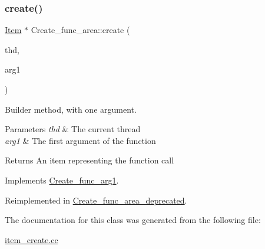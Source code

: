 \subsubsection{\texorpdfstring{create()}{create()}}
{\footnotesize\ttfamily \mbox{\hyperlink{classItem}{Item}} $\ast$ Create\+\_\+func\+\_\+area\+::create (\begin{DoxyParamCaption}\item[{T\+HD $\ast$}]{thd,  }\item[{\mbox{\hyperlink{classItem}{Item}} $\ast$}]{arg1 }\end{DoxyParamCaption})\hspace{0.3cm}{\ttfamily [virtual]}}

Builder method, with one argument. 
\begin{DoxyParams}{Parameters}
{\em thd} & The current thread \\
\hline
{\em arg1} & The first argument of the function \\
\hline
\end{DoxyParams}
\begin{DoxyReturn}{Returns}
An item representing the function call 
\end{DoxyReturn}


Implements \mbox{\hyperlink{classCreate__func__arg1_a3e9a98f755cd82c3e762e334c955a8c9}{Create\+\_\+func\+\_\+arg1}}.



Reimplemented in \mbox{\hyperlink{classCreate__func__area__deprecated_a8f1158f60042c56c8958242d069d65b1}{Create\+\_\+func\+\_\+area\+\_\+deprecated}}.



The documentation for this class was generated from the following file\+:\begin{DoxyCompactItemize}
\item 
\mbox{\hyperlink{item__create_8cc}{item\+\_\+create.\+cc}}\end{DoxyCompactItemize}
